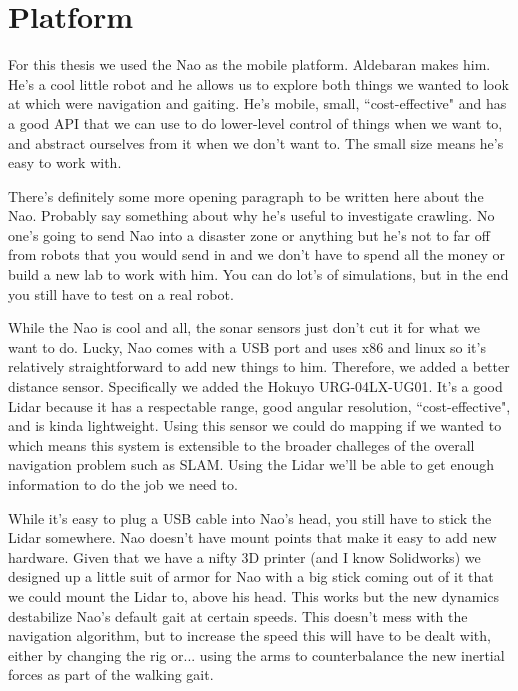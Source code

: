 
\chapter{Platform} \label{ch:platform}

For this thesis we used the Nao as the mobile platform. Aldebaran makes him. He's a cool little robot and he allows us to explore both
things we wanted to look at which were navigation and gaiting. He's mobile, small, ``cost-effective"
and has a good API that we can use to do lower-level control of things when we want to, 
and abstract ourselves from it when we don't want to.
The small size means he's easy to work with.

There's definitely some more opening paragraph to be written here about the Nao.
Probably say something about why he's useful to investigate crawling. No one's going to send
Nao into a disaster zone or anything but he's not to far off from robots that you would send in
and we don't have to spend all the money or build a new lab to work with him. You can do lot's of
simulations, but in the end you still have to test on a real robot.

While the Nao is cool and all, the sonar sensors just don't cut it for what we want to do.
Lucky, Nao comes with a USB port and uses x86 and linux so it's relatively straightforward to
add new things to him.
Therefore, we added a better distance sensor. Specifically we added the Hokuyo URG-04LX-UG01.
It's a good Lidar because it has a respectable range, good angular resolution, ``cost-effective",
and is kinda lightweight.
Using this sensor we could do mapping if we wanted to which means this system is extensible to the
broader challeges of the overall navigation problem such as SLAM. Using the Lidar we'll be
able to get enough information to do the job we need to.

While it's easy to plug a USB cable into Nao's head, you still have to stick the Lidar somewhere.
Nao doesn't have mount points that make it easy to add new hardware.
Given that we have a nifty 3D printer (and I know Solidworks) we designed up a little suit of
armor for Nao with a big stick coming out of it that we could mount the Lidar to, above his head.
This works but the new dynamics destabilize Nao's default gait at certain speeds. 
This doesn't mess with the navigation algorithm, but to increase the speed this will have to be dealt with,
either by changing the rig or... using the arms to counterbalance the new inertial forces as
part of the walking gait.

